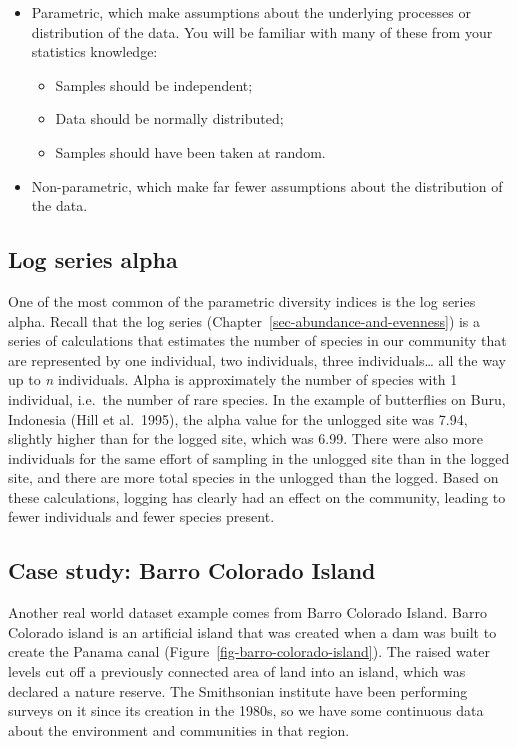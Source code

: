 \documentclass[
  letterpaper,
  DIV=11,
  numbers=noendperiod]{scrreprt}
\providecommand{\tightlist}{%
  \setlength{\itemsep}{0pt}\setlength{\parskip}{0pt}}
\begin{document}
\begin{itemize}
\tightlist
\item
  Parametric, which make assumptions about the underlying processes or
  distribution of the data. You will be familiar with many of these from
  your statistics knowledge:

  \begin{itemize}
  \tightlist
  \item
    Samples should be independent;
  \item
    Data should be normally distributed;
  \item
    Samples should have been taken at random.
  \end{itemize}
\item
  Non-parametric, which make far fewer assumptions about the
  distribution of the data.
\end{itemize}

\subsection{Log series alpha}\label{log-series-alpha}

One of the most common of the parametric diversity indices is the log
series alpha. Recall that the log series
(Chapter~\ref{sec-abundance-and-evenness}) is a series of calculations
that estimates the number of species in our community that are
represented by one individual, two individuals, three
individuals\ldots{} all the way up to \emph{n} individuals. Alpha is
approximately the number of species with 1 individual, i.e.~the number
of rare species. In the example of butterflies on Buru, Indonesia (Hill
et al.~1995), the alpha value for the unlogged site was 7.94, slightly
higher than for the logged site, which was 6.99. There were also more
individuals for the same effort of sampling in the unlogged site than in
the logged site, and there are more total species in the unlogged than
the logged. Based on these calculations, logging has clearly had an
effect on the community, leading to fewer individuals and fewer species
present.

\subsection{Case study: Barro Colorado
Island}\label{case-study-barro-colorado-island}

Another real world dataset example comes from Barro Colorado Island.
Barro Colorado island is an artificial island that was created when a
dam was built to create the Panama canal
(Figure~\ref{fig-barro-colorado-island}). The raised water levels cut
off a previously connected area of land into an island, which was
declared a nature reserve. The Smithsonian institute have been
performing surveys on it since its creation in the 1980s, so we have
some continuous data about the environment and communities in that
region.
\end{document}
